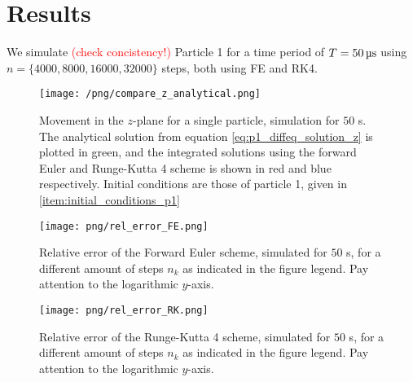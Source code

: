 \section{Results}\label{sec:results}



We simulate \textcolor{red}{(check concistency!)} Particle 1 for a time period of $T = 50 \,\mathrm{\text{\textmu} s}$ using $n=\{4000, 8000, 16000, 32000 \}$ steps, both using FE and RK4. %


\begin{figure}
    \texttt{[image: /png/compare\_z\_analytical.png]}
    \caption{Movement in the $z$-plane for a single particle, simulation for $50$ \textmu s. The analytical solution from equation \ref{eq:p1_diffeq_solution_z} is plotted in green, and the integrated solutions using the forward Euler and Runge-Kutta 4 scheme is shown in red and blue respectively. Initial conditions are those of particle 1, given in \ref{item:initial_conditions_p1} }
    \label{fig:compare_z_analytical}
\end{figure}


\begin{figure}
    \texttt{[image: png/rel\_error\_FE.png]}
    \caption{Relative error of the Forward Euler scheme, simulated for $50$ \textmu s, for a different amount of steps $n_k$ as indicated in the figure legend. Pay attention to the logarithmic $y$-axis.}
    \label{fig:error_FE}
\end{figure}


\begin{figure}
    \texttt{[image: png/rel\_error\_RK.png]}
    \caption{Relative error of the Runge-Kutta 4 scheme, simulated for $50$ \textmu s, for a different amount of steps $n_k$ as indicated in the figure legend. Pay attention to the logarithmic $y$-axis.}
    \label{fig:error_RK}
\end{figure}

